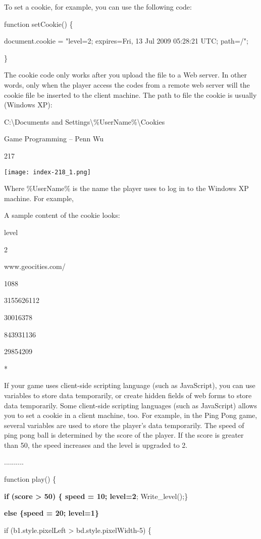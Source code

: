 \documentclass[
]{article}
\begin{document}
To set a cookie, for example, you can use the following code:

function setCookie() \{

document.cookie = "level=2; expires=Fri, 13 Jul 2009 05:28:21 UTC;
path=/";

\}

The cookie code only works after you upload the file to a Web server. In
other words, only when the player access the codes from a remote web
server will the cookie file be inserted to the client machine. The path
to file the cookie is usually (Windows XP):

C:\textbackslash Documents and
Settings\textbackslash\%UserName\%\textbackslash Cookies

Game Programming -- Penn Wu

217

\protect\hypertarget{index_split_011.htmlux5cux23p218}{}{}\texttt{[image: index-218\_1.png]}

Where \%UserName\% is the name the player uses to log in to the Windows
XP machine. For example,

A sample content of the cookie looks:

level

2

www.geocities.com/

1088

3155626112

30016378

843931136

29854209

*

If your game uses client-side scripting language (such as JavaScript),
you can use variables to store data temporarily, or create hidden fields
of web forms to store data temporarily. Some client-side scripting
languages (such as JavaScript) allows you to set a cookie in a client
machine, too. For example, in the Ping Pong game, several variables are
used to store the player's data temporarily. The speed of ping pong ball
is determined by the score of the player. If the score is greater than
50, the speed increases and the level is upgraded to 2.

..........

function play() \{

\textbf{if (score \textgreater{} 50) \{ speed = 10; level=2};
Write\_level();\}

\textbf{else \{speed = 20; level=1\}}

if (b1.style.pixelLeft \textgreater{} bd.style.pixelWidth-5) \{
\end{document}
